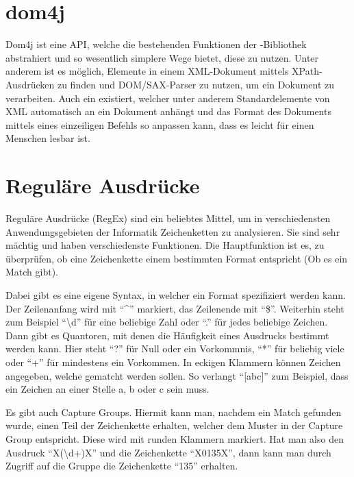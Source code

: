 \section{dom4j}

Dom4j ist eine API, welche die bestehenden Funktionen der -Bibliothek abstrahiert und so wesentlich simplere Wege bietet, diese zu nutzen.
Unter anderem ist es möglich, Elemente in einem XML-Dokument mittels XPath-Ausdrücken zu finden und DOM/SAX-Parser zu nutzen, um ein Dokument zu verarbeiten.
Auch ein  existiert, welcher unter anderem Standardelemente von XML automatisch an ein Dokument anhängt und das Format des Dokuments mittels eines einzeiligen Befehls so anpassen kann, dass es leicht für einen Menschen lesbar ist.

\section{Reguläre Ausdrücke}

Reguläre Ausdrücke (RegEx) sind ein beliebtes Mittel, um in verschiedensten Anwendungsgebieten der Informatik Zeichenketten zu analysieren.
Sie sind sehr mächtig und haben verschiedenste Funktionen.
Die Hauptfunktion ist es, zu überprüfen, ob eine Zeichenkette einem bestimmten Format entspricht (Ob es ein Match gibt).

Dabei gibt es eine eigene Syntax, in welcher ein Format spezifiziert werden kann.
Der Zeilenanfang wird mit \enquote{\textasciicircum} markiert, das Zeilenende mit \enquote{\$}.
Weiterhin steht zum Beispiel \enquote{\textbackslash d} für eine beliebige Zahl oder \enquote{.} für jedes beliebige Zeichen.
Dann gibt es Quantoren, mit denen die Häufigkeit eines Ausdrucks bestimmt werden kann.
Hier steht \enquote{?} für Null oder ein Vorkommnis, \enquote{*} für beliebig viele oder \enquote{+} für mindestens ein Vorkommen.
In eckigen Klammern können Zeichen angegeben, welche gematcht werden sollen. So verlangt \enquote{[abc]} zum Beispiel, dass ein Zeichen an einer Stelle a, b oder c sein muss.

Es gibt auch Capture Groups. Hiermit kann man, nachdem ein Match gefunden wurde, einen Teil der Zeichenkette erhalten, welcher dem Muster in der Capture Group entspricht. Diese wird mit runden Klammern markiert.
Hat man also den Ausdruck \enquote{X(\textbackslash d+)X} und die Zeichenkette \enquote{X0135X}, dann kann man durch Zugriff auf die Gruppe die Zeichenkette \enquote{135} erhalten.


